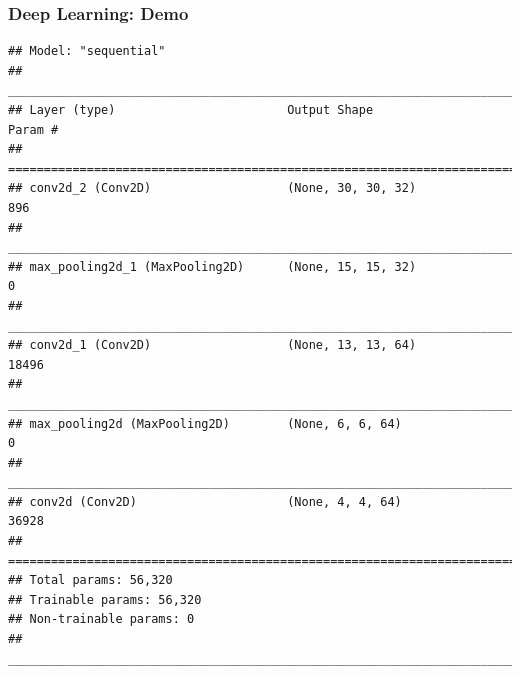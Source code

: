 \documentclass[
  shownotes,
  xcolor={svgnames},
  hyperref={colorlinks,citecolor=DarkBlue,linkcolor=DarkRed,urlcolor=DarkBlue}
  , aspectratio=169]{beamer}
\begin{document}
\begin{frame}[fragile]
\frametitle{Deep Learning: Demo}

\begin{tiny}
\begin{verbatim}
## Model: "sequential"
## ________________________________________________________________________________
## Layer (type)                        Output Shape                    Param #     
## ================================================================================
## conv2d_2 (Conv2D)                   (None, 30, 30, 32)              896         
## ________________________________________________________________________________
## max_pooling2d_1 (MaxPooling2D)      (None, 15, 15, 32)              0           
## ________________________________________________________________________________
## conv2d_1 (Conv2D)                   (None, 13, 13, 64)              18496       
## ________________________________________________________________________________
## max_pooling2d (MaxPooling2D)        (None, 6, 6, 64)                0           
## ________________________________________________________________________________
## conv2d (Conv2D)                     (None, 4, 4, 64)                36928       
## ================================================================================
## Total params: 56,320
## Trainable params: 56,320
## Non-trainable params: 0
## ________________________________________________________________________________
\end{verbatim}
\end{tiny}

\end{frame}
\end{document}
